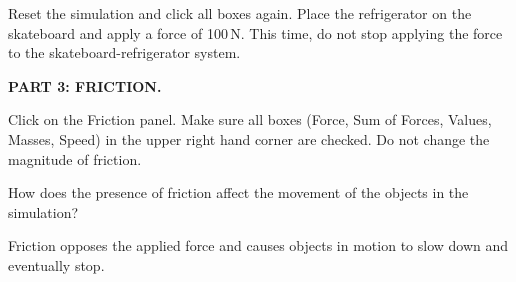 \documentclass[../main-physics-problems.tex]{subfiles}
\begin{document}
\begin{questions}
\question
Reset the simulation and click all boxes again. Place the refrigerator on the skateboard and apply a force of 100\,N. This time, do not stop applying the force to the skateboard-refrigerator system. 


\begin{EnvUplevel}
    \textbf{PART 3: FRICTION.}

    Click on the Friction panel. Make sure all boxes (Force, Sum of Forces, Values, Masses, Speed) in the upper right hand corner are checked. Do not change the magnitude of friction.
\end{EnvUplevel}

\question
How does the presence of friction affect the movement of the objects in the simulation?

\begin{solution}
    Friction opposes the applied force and causes objects in motion to slow down and eventually stop.
\end{solution}


\end{questions}
\end{document}
